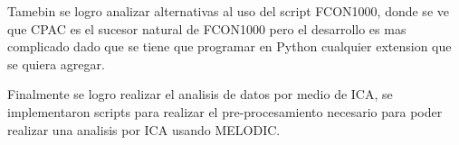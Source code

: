 \documentclass{article}
\begin{document}
Tamebin se logro analizar alternativas al uso del script FCON1000, donde se ve que CPAC es el sucesor natural de FCON1000 pero el desarrollo es mas complicado dado que se tiene que programar en Python cualquier extension que se quiera agregar.

Finalmente se logro realizar el analisis de datos por medio de ICA, se implementaron scripts para realizar el pre-procesamiento necesario para poder realizar una analisis por ICA usando MELODIC.
\end{document}
